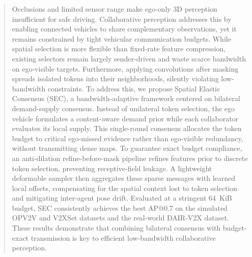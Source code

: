 \begin{abstract}
Occlusions and limited sensor range make ego-only 3D perception insufficient for safe driving. Collaborative perception addresses this by enabling connected vehicles to share complementary observations, yet it remains constrained by tight vehicular communication budgets. While spatial selection is more flexible than fixed-rate feature compression, existing selectors remain largely sender-driven and waste scarce bandwidth on ego-visible targets. Furthermore, applying convolutions after masking spreads isolated tokens into their neighborhoods, silently violating low-bandwidth constraints. To address this, we propose Spatial Elastic Consensus (SEC), a bandwidth-adaptive framework centered on bilateral demand-supply consensus. Instead of unilateral token selection, the ego vehicle formulates a content-aware demand prior while each collaborator evaluates its local supply. This single-round consensus allocates the token budget to critical ego-missed evidence rather than ego-visible redundancy, without transmitting dense maps. To guarantee exact budget compliance, an anti-dilation refine-before-mask pipeline refines features prior to discrete token selection, preventing receptive-field leakage. A lightweight deformable sampler then aggregates these sparse messages with learned local offsets, compensating for the spatial context lost to token selection and mitigating inter-agent pose drift. Evaluated at a stringent 64~KiB budget, SEC consistently achieves the best AP@0.7 on the simulated OPV2V and V2XSet datasets and the real-world DAIR-V2X dataset. These results demonstrate that combining bilateral consensus with budget-exact transmission is key to efficient low-bandwidth collaborative perception.
\end{abstract}

